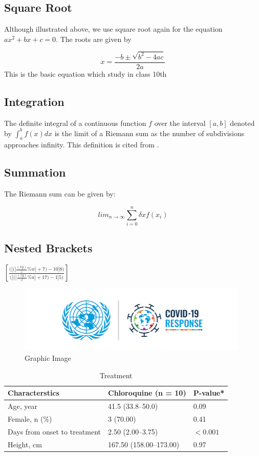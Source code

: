 \documentclass{article}
\begin{document}
\subsection{Square Root}

Although illustrated above, we use square root again for the equation \(ax^2 + bx + c = 0\). The roots are given by

\[
x = \frac{-b \pm \sqrt{b^2 - 4ac}}{2a}
\]
This is the basic equation which study in class 10th \cite{education2016mathematics}
\subsection{Integration}

The definite integral of a continuous function \(f\) over the interval \([a, b]\) denoted by \(\int_{a}^{b} f(x)dx\) is the limit of a Riemann sum as the number of subdivisions approaches infinity. This definition is cited from \cite{ghorpade2018course}.

\subsection{Summation}

The Riemann sum can be given by:

\[
\textit{lim}_{{n \to \infty}} \sum_{{i=0}}^{n} \delta xf(x_i)
\]

\subsection{Nested Brackets}
$\left[ \frac{\Bigg(\bigg[\Big(\big[\frac{(xy)}{z} \% w\big]+ 7\Big)- 10\bigg]8\Bigg)}{\Bigg(\bigg[\Big(\big[\frac{(zy)}{x} \% u\big]+ 17\Big)- 1\bigg]5\Bigg)} \right]$
\newpage
\begin{figure}[h]
    \centering
    \includegraphics[width=11cm]{covid.png}
    \caption{Graphic Image}
    \label{fig:enter-label}
\end{figure}
\begin{table}[h!]
\centering
\begin{tabular}{|l|l|l|}
\hline
Characterstics & Chloroquine (n = 10) & P-value*\\
\hline \hline
Age, year & 41.5 (33.8–50.0) & 0.09 \\
\hline
Female, n (\%) & 3 (70.00) & 0.41 \\
\hline
Days from onset to treatment & 2.50 (2.00–3.75) & \(<0.001\) \\
\hline
Height, cm & 167.50 (158.00–173.00) & 0.97 \\
\hline
\end{tabular}
\caption{Treatment}
\end{table} 
\end{document}
